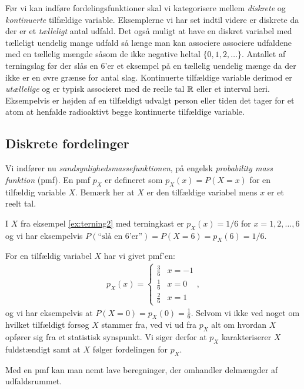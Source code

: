 Før vi kan indføre fordelingsfunktioner skal vi kategorisere mellem \emph{diskrete} og \emph{kontinuerte} tilfældige variable. Eksemplerne vi har set indtil videre er diskrete da der er et \emph{tælleligt} antal udfald. Det også muligt at have en diskret variabel med tælleligt uendelig mange udfald så længe man kan associere associere udfaldene med en tællelig mængde såsom de ikke negative heltal $\{0,1,2,\dots\}$. Antallet af terningslag før der slås en 6'er et eksempel på en tællelig uendelig mænge da der ikke er en øvre grænse for antal slag. Kontinuerte tilfældige variable derimod er \textit{utællelige} og er typisk associeret med de reelle tal $\mathbb{R}$ eller et interval heri. Eksempelvis er højden af en tilfældigt udvalgt person eller tiden det tager for et atom at henfalde radioaktivt begge kontinuerte tilfældige variable. 
\subsection{Diskrete fordelinger}
Vi indfører nu \emph{sandsynlighedsmassefunktionen}, på engelsk \textit{probability mass funktion} (pmf). En pmf $p_X$ er defineret som $p_X(x) = P(X = x)$ for en tilfældig variable $X$. Bemærk her at $X$ er den tilfældige variabel mens $x$ er et reelt tal.
\begin{example} \label{ex:terning3} I $X$ fra eksempel \ref{ex:terning2} med terningkast er $p_X(x) = 1/6$ for $x = 1,2,\dots, 6$ og vi har eksempelvis $P(\text{``slå en 6'er''}) = P(X = 6) = p_X(6) = 1/6$. 
\end{example}
\begin{example} \label{ex:terning4} For en tilfældig variabel $X$ har vi givet pmf'en:
\begin{align*}
p_X(x) = \begin{cases}
\frac{3}{6} & x = -1 \\
\frac{1}{6} & x = 0 \\ 
\frac{2}{6} & x = 1
\end{cases},
\end{align*}
og vi har eksempelvis at $P(X = 0) = p_X(0) = \frac{1}{6}$. Selvom vi ikke ved noget om hvilket tilfældigt forsøg $X$ stammer fra, ved vi ud fra $p_X$ alt om hvordan $X$ opfører sig fra et statistisk synspunkt. Vi siger derfor at $p_X$ karakteriserer $X$ fuldstændigt samt at $X$ følger fordelingen for $p_X$. 
\end{example}
Med en pmf kan man nemt lave beregninger, der omhandler delmængder af udfaldsrummet. 
